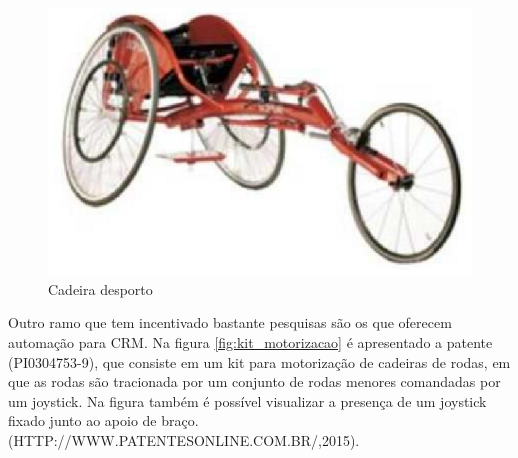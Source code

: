\begin{figure}[!htb]
  \centering
  \includegraphics[keepaspectratio=true,scale=0.50]{figuras/introducao/cadeira_desporte}
  \caption{Cadeira desporto}
  \label{fig:desporto}
\end{figure}


Outro ramo que tem incentivado bastante pesquisas são os que oferecem automação para CRM. Na figura \ref{fig:kit_motorizacao} é apresentado a patente (PI0304753-9), que consiste em um kit para motorização de cadeiras de rodas, em que as rodas são tracionada por um conjunto de rodas menores comandadas por um joystick. Na figura também é possível visualizar a presença de um joystick fixado junto ao apoio de braço. (HTTP://WWW.PATENTESONLINE.COM.BR/,2015).

